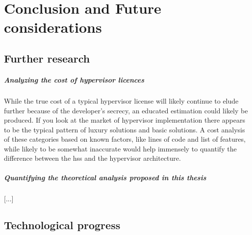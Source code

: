 
\chapter{Conclusion and Future considerations} %

\label{Chapter6} %


\newcommand{\keyword}[1]{\textbf{#1}}
\newcommand{\tabhead}[1]{\textbf{#1}}
\newcommand{\code}[1]{\texttt{#1}}
\newcommand{\file}[1]{\texttt{\bfseries#1}}
\newcommand{\option}[1]{\texttt{\itshape#1}}


\section{Further research}
\paragraph{Analyzing the cost of hypervisor licences}
While the true cost of a typical hypervisor license will likely continue to elude further because of the developer's secrecy, an educated estimation could likely be produced. If you look at the market of hypervisor implementation there appears to be the typical pattern of luxury solutions and basic solutions. A cost analysis of these categories based on known factors, like lines of code and list of features, while likely to be somewhat inaccurate would help immensely to quantify the difference between the \acrshort{hss} and the hypervisor architecture.
\paragraph{Quantifying the theoretical analysis proposed in this thesis}
[...]

\section{Technological progress} \label{tech-progress}
